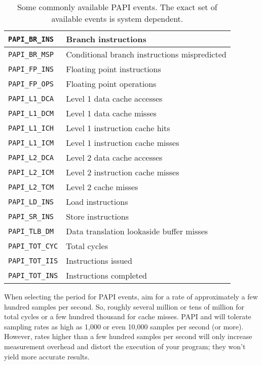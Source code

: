 \begin{table}
\begin{center}
\begin{tabular}{|l|l|}
\hline
\verb|PAPI_BR_INS| & Branch instructions \\
\hline
\verb|PAPI_BR_MSP| & Conditional branch instructions mispredicted \\
\hline
\verb|PAPI_FP_INS| & Floating point instructions \\
\hline
\verb|PAPI_FP_OPS| & Floating point operations \\
\hline
\verb|PAPI_L1_DCA| & Level 1 data cache accesses \\
\hline
\verb|PAPI_L1_DCM| & Level 1 data cache misses \\
\hline
\verb|PAPI_L1_ICH| & Level 1 instruction cache hits \\
\hline
\verb|PAPI_L1_ICM| & Level 1 instruction cache misses \\
\hline
\verb|PAPI_L2_DCA| & Level 2 data cache accesses \\
\hline
\verb|PAPI_L2_ICM| & Level 2 instruction cache misses \\
\hline
\verb|PAPI_L2_TCM| & Level 2 cache misses \\
\hline
\verb|PAPI_LD_INS| & Load instructions \\
\hline
\verb|PAPI_SR_INS| & Store instructions \\
\hline
\verb|PAPI_TLB_DM| & Data translation lookaside buffer misses \\
\hline
\verb|PAPI_TOT_CYC| & Total cycles \\
\hline
\verb|PAPI_TOT_IIS| & Instructions issued \\
\hline
\verb|PAPI_TOT_INS| & Instructions completed \\
\hline
\end{tabular}
\end{center}
\caption{Some commonly available PAPI events.
The exact set of available events is system dependent.}
\label{tab:papi-events}
\end{table}

When selecting the period for PAPI events, aim for a rate of
approximately a few hundred samples per second.  So, roughly several
million or tens of million for total cycles or a few hundred thousand
for cache misses.  PAPI and \hpcrun{} will tolerate sampling rates as
high as 1,000 or even 10,000 samples per second (or more).  However, rates
higher than a few hundred samples per second will only increase measurement
overhead and distort the execution of your program; they won't yield more
accurate results.

